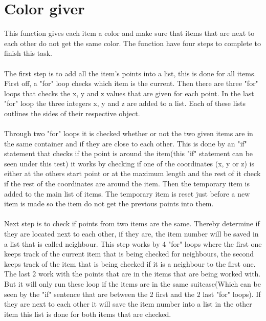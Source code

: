 \section{Color giver}
This function gives each item a color and make sure that items that are next to each other do not get the same color. The function have four steps to complete to finish this task.\\
\\
The first step is to add all the item's points into a list, this is done for all items. First off, a "for" loop checks which item is the current. Then there are three "for" loops that checks the x, y and z values that are given for each point. In the last "for" loop the three integers x, y and z are added to a list. Each of these lists outlines the sides of their respective object.\\ 
\\
Through two "for" loops it is checked whether or not the two given items are in the same container and if they are close to each other. This is done by an "if" statement that checks if the point is around the item(this "if" statement can be seen under this test) it works by checking if one of the coordinates (x, y or z) is either at the others start point or at the maximum length and the rest of it check if the rest of the coordinates are around the item. Then the temporary item is added to the main list of items.  The temporary item is reset just before a new item is made so the item do not get the previous points into them.\\
\\
Next step is to check if points from two items are the same. Thereby determine if they are located next to each other, if they are, the item number will be saved in a list that is called neighbour. This step works by 4 "for" loops where the first one keeps track of the current item that is being checked for neighbours, the second keeps track of the item that is being checked if it is a neighbour to the first one. The last 2 work with the points that are in the items that are being worked with. But it will only run these loop if the items are in the same suitcase(Which can be seen by the "if" sentence that are between the 2 first and the 2 last "for" loops). If they are next to each other it will save the item number into a list in the other item this list is done for both items that are checked.\\
